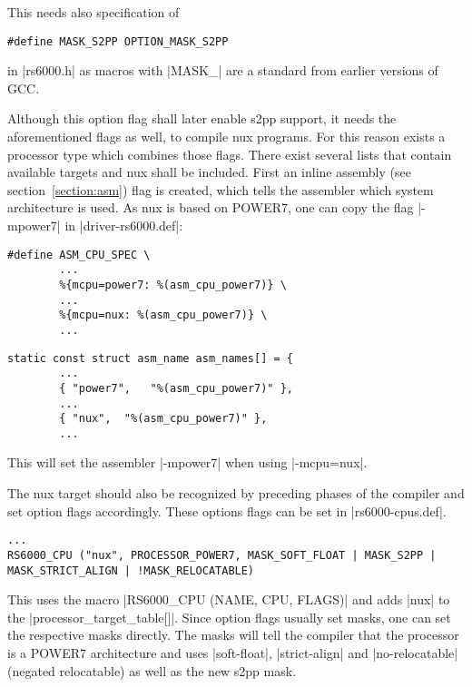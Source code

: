 This needs also specification of 
\begin{lstlisting}
#define MASK_S2PP OPTION_MASK_S2PP
\end{lstlisting}
in |rs6000.h| as macros with |MASK_| are a standard from earlier versions of \ac{GCC}.

Although this option flag shall later enable \ac{s2pp} support, it needs the aforementioned flags as well, to compile nux programs.
For this reason exists a processor type which combines those flags.
There exist several lists that contain available targets and nux shall be included.
First an inline assembly (see section~\ref{section:asm}) flag is created, which tells the assembler which system architecture is used.
As nux is based on POWER7, one can copy the flag |-mpower7| in |driver-rs6000.def|:
    \begin{lstlisting}[caption=\tt rs6000.h]
    #define ASM_CPU_SPEC \
        ...
        %{mcpu=power7: %(asm_cpu_power7)} \
        ...
        %{mcpu=nux: %(asm_cpu_power7)} \
        ...
    \end{lstlisting}
    \begin{lstlisting}[caption=\tt driver-rs6000.c]
    static const struct asm_name asm_names[] = {
        ...
        { "power7",   "%(asm_cpu_power7)" },
        ...
        { "nux",  "%(asm_cpu_power7)" },
        ...
    \end{lstlisting}
This will set the assembler |-mpower7| when using |-mcpu=nux|.

The nux target should also be recognized by preceding phases of the compiler and set option flags accordingly.
These options flags can be set in |rs6000-cpus.def|.

\begin{lstlisting}
...
RS6000_CPU ("nux", PROCESSOR_POWER7, MASK_SOFT_FLOAT | MASK_S2PP | MASK_STRICT_ALIGN | !MASK_RELOCATABLE)
\end{lstlisting}

This uses the macro |RS6000_CPU (NAME, CPU, FLAGS)| and adds |nux| to the |processor_target_table[]|.
Since option flags usually set masks, one can set the respective masks directly.
The masks will tell the compiler that the processor is a POWER7 architecture and uses |soft-float|, |strict-align| and |no-relocatable|(negated relocatable) as well as the new s2pp mask.

